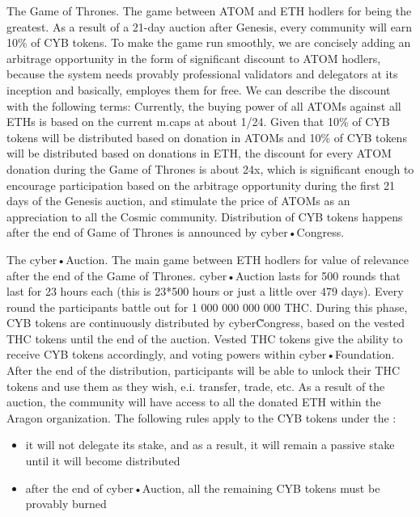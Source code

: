 \documentclass[8pt,oneside]{amsart}
\newcommand{\linkgreen}[2]{\href{#1}{\color{green}{#2}}}
\begin{document}
The Game of Thrones. The game between ATOM and ETH hodlers for being the greatest. As a result of a 21-day auction after Genesis, every community will earn 10\% of CYB tokens. To make the game run smoothly, we are concisely adding an arbitrage opportunity in the form of significant discount to ATOM hodlers, because the system needs provably professional validators and delegators at its inception and basically, employes them for free. We can describe the discount with the following terms: Currently, the buying power of all ATOMs against all ETHs is based on the current m.caps at about 1/24. Given that 10\% of CYB tokens will be distributed based on donation in ATOMs and 10\% of CYB tokens will be distributed based on donations in ETH, the discount for every ATOM donation during the Game of Thrones is about 24x, which is significant enough to encourage participation based on the arbitrage opportunity during the first 21 days of the Genesis auction, and stimulate the price of ATOMs as an appreciation to all the Cosmic community. Distribution of CYB tokens happens after the end of Game of Thrones is announced by cyber•Congress.

The cyber•Auction. The main game between ETH hodlers for value of relevance after the end of the Game of Thrones. cyber•Auction lasts for 500 rounds that last for 23 hours each (this is 23*500 hours or just a little over 479 days). Every round the participants battle out for 1 000 000 000 000 THC. During this phase, CYB tokens are continuously distributed by cyber\~Congress, based on the vested THC tokens until the end of the auction. Vested THC tokens give the ability to receive CYB tokens accordingly, and voting powers within cyber•Foundation. After the end of the distribution, participants will be able to unlock their THC tokens and use them as they wish, e.i. transfer, trade, etc. As a result of the auction, the community will have access to all the donated ETH within the Aragon organization. The following rules apply to the CYB tokens under the \linkgreen{https://cyberd.ai/account/cyber12v6jzx9vea277aqj0nffll8ewvme35w94yv258}{multisig for CYB distribution}:

\begin{itemize}
\item it will not delegate its stake, and as a result, it will remain a passive stake until it will become distributed
\item after the end of cyber•Auction, all the remaining CYB tokens must be provably burned
\end{itemize}
\end{document}
